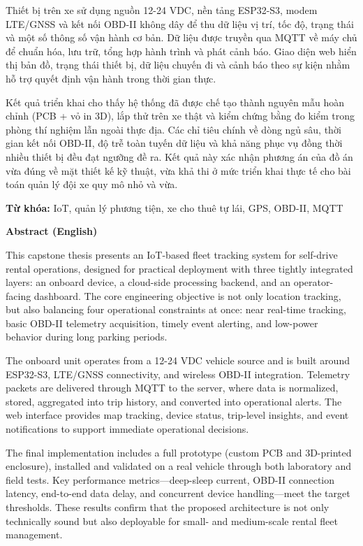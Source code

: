 \documentclass[a4paper]{extarticle}
\begin{document}
Thiết bị trên xe sử dụng nguồn 12-24 VDC, nền tảng ESP32-S3, modem LTE/GNSS và kết nối OBD-II không dây để thu dữ liệu vị trí, tốc độ, trạng thái và một số thông số vận hành cơ bản. Dữ liệu được truyền qua MQTT về máy chủ để chuẩn hóa, lưu trữ, tổng hợp hành trình và phát cảnh báo. Giao diện web hiển thị bản đồ, trạng thái thiết bị, dữ liệu chuyến đi và cảnh báo theo sự kiện nhằm hỗ trợ quyết định vận hành trong thời gian thực.

Kết quả triển khai cho thấy hệ thống đã được chế tạo thành nguyên mẫu hoàn chỉnh (PCB + vỏ in 3D), lắp thử trên xe thật và kiểm chứng bằng đo kiểm trong phòng thí nghiệm lẫn ngoài thực địa. Các chỉ tiêu chính về dòng ngủ sâu, thời gian kết nối OBD-II, độ trễ toàn tuyến dữ liệu và khả năng phục vụ đồng thời nhiều thiết bị đều đạt ngưỡng đề ra. Kết quả này xác nhận phương án của đồ án vừa đúng về mặt thiết kế kỹ thuật, vừa khả thi ở mức triển khai thực tế cho bài toán quản lý đội xe quy mô nhỏ và vừa.

\textbf{Từ khóa:} IoT, quản lý phương tiện, xe cho thuê tự lái, GPS, OBD-II, MQTT

\textbf{Abstract (English)}

This capstone thesis presents an IoT-based fleet tracking system for self-drive rental operations, designed for practical deployment with three tightly integrated layers: an onboard device, a cloud-side processing backend, and an operator-facing dashboard. The core engineering objective is not only location tracking, but also balancing four operational constraints at once: near real-time tracking, basic OBD-II telemetry acquisition, timely event alerting, and low-power behavior during long parking periods.

The onboard unit operates from a 12-24 VDC vehicle source and is built around ESP32-S3, LTE/GNSS connectivity, and wireless OBD-II integration. Telemetry packets are delivered through MQTT to the server, where data is normalized, stored, aggregated into trip history, and converted into operational alerts. The web interface provides map tracking, device status, trip-level insights, and event notifications to support immediate operational decisions.

The final implementation includes a full prototype (custom PCB and 3D-printed enclosure), installed and validated on a real vehicle through both laboratory and field tests. Key performance metrics---deep-sleep current, OBD-II connection latency, end-to-end data delay, and concurrent device handling---meet the target thresholds. These results confirm that the proposed architecture is not only technically sound but also deployable for small- and medium-scale rental fleet management.
\end{document}
